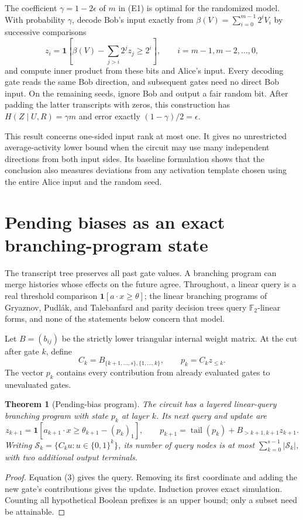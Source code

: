 \documentclass[11pt]{article}
\newtheorem{theorem}{Theorem}[section]
\theoremstyle{definition}
\newcommand{\bits}{\{0,1\}}
\newcommand{\F}{\mathbb F}
\newcommand{\ind}[1]{\mathbf 1[#1]}
\begin{document}
The coefficient \(\gamma=1-2\epsilon\) of \(m\) in (E1) is optimal for
the randomized model. With probability \(\gamma\), decode Bob's input
exactly from \(\beta(V)=\sum_{i=0}^{m-1}2^iV_i\) by successive comparisons
\[
 z_i=\ind{\beta(V)-\sum_{j>i}2^jz_j\ge2^i},
 \qquad i=m-1,m-2,\ldots,0,
\]
and compute inner product from these bits and Alice's input. Every decoding
gate reads the same Bob direction, and subsequent gates need no direct
Bob input. On the remaining seeds, ignore Bob and output a fair random bit.
After padding the latter transcripts with zeros, this construction has
\(H(Z\mid U,R)=\gamma m\) and error exactly
\((1-\gamma)/2=\epsilon\).

This result concerns one-sided input rank at most one. It gives no
unrestricted average-activity lower bound when the circuit may use many
independent directions from both input sides. Its baseline formulation shows
that the conclusion also measures deviations from any activation template
chosen using the entire Alice input and the random seed.


\section{Pending biases as an exact branching-program state}\label{sec:bias}
The transcript tree preserves all past gate values. A branching program can merge histories whose effects on the future agree. Throughout, a linear query is a real threshold comparison \(\ind{a\cdot x\ge\theta}\); the linear branching programs of Gryaznov, Pudl\'ak, and Talebanfard \cite{GPT22} and parity decision trees query \(\F_2\)-linear forms, and none of the statements below concern that model.

Let \(B=(b_{ij})\) be the strictly lower triangular internal weight matrix. At the cut after gate \(k\), define
\[
 C_k=B_{\{k+1,\ldots,s\},\{1,\ldots,k\}},
 \qquad p_k=C_k z_{\le k}.
\]
The vector \(p_k\) contains every contribution from already evaluated gates to unevaluated gates.

\begin{theorem}[Pending-bias program]\label{thm:bias}
The circuit has a layered linear-query branching program with state \(p_k\) at layer \(k\). Its next query and update are
\[
 z_{k+1}=\ind{a_{k+1}\cdot x\ge\theta_{k+1}-(p_k)_1},
 \qquad
 p_{k+1}=\operatorname{tail}(p_k)+B_{>k+1,k+1}z_{k+1}.    \tag{8}
\]
Writing \(\mathcal S_k=\{C_ku:u\in\bits^k\}\), its number of query nodes is at most
\(\sum_{k=0}^{s-1}|\mathcal S_k|\), with two additional output terminals.
\end{theorem}
\begin{proof}
Equation (3) gives the query. Removing its first coordinate and adding the new gate's contributions gives the update. Induction proves exact simulation. Counting all hypothetical Boolean prefixes is an upper bound; only a subset need be attainable.
\end{proof}
\end{document}
